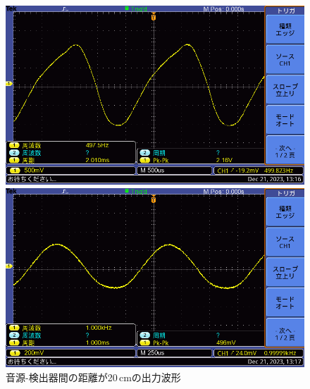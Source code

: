 \documentclass{ltjsarticle}
\begin{document}
\begin{figure}[H]
\begin{minipage}{0.4\columnwidth}
			\end{minipage}
			\hspace{0.04\columnwidth}
			\begin{minipage}{0.4\columnwidth}
			\centering
			\includegraphics[width = \columnwidth]{figs/F0029TEK.PNG}
			\end{minipage}
			\hspace{0.04\columnwidth}
			\begin{minipage}{0.4\columnwidth}
			\centering
			\includegraphics[width = \columnwidth]{figs/F0030TEK.PNG}
			\end{minipage}
			\caption{音源-検出器間の距離が20\,cmの出力波形}
			\label{fig:week5-3-20}
			\end{figure}
\end{document}
